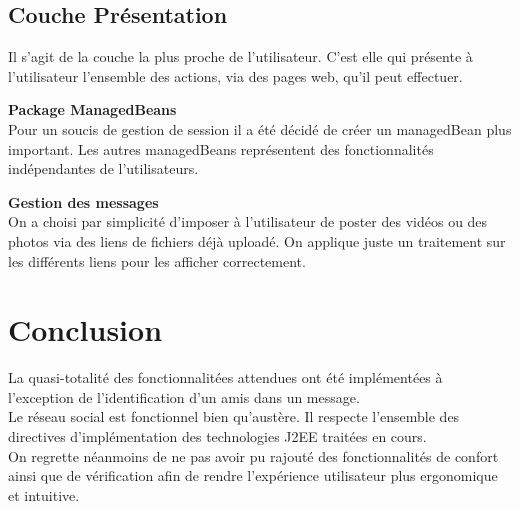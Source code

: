 \documentclass[12pt,a4paper,titlepage]{article}
\begin{document}
\subsection{Couche Présentation}
Il s'agit de la couche la plus proche de l'utilisateur. C'est elle qui présente à l'utilisateur 
l'ensemble des actions, via des pages web, qu'il peut effectuer.
\newline

\textbf{Package ManagedBeans}\\
Pour un soucis de gestion de session il a été décidé de créer un managedBean plus important.
Les autres managedBeans représentent des fonctionnalités indépendantes de l'utilisateurs.
\newline

\textbf{Gestion des messages}\\
On a choisi par simplicité d'imposer à l'utilisateur de poster des vidéos ou des photos 
via des liens de fichiers déjà uploadé. On applique juste un traitement sur les différents 
liens pour les afficher correctement.






\clearpage{\pagestyle{empty}}



\section{Conclusion}
La quasi-totalité des fonctionnalitées attendues ont été implémentées à l'exception 
de l'identification d'un amis dans un message.\\
Le réseau social est fonctionnel bien qu'austère. Il respecte l'ensemble des directives 
d'implémentation des technologies J2EE traitées en cours.\\
On regrette néanmoins de ne pas avoir pu rajouté des fonctionnalités de confort ainsi 
que de vérification afin de rendre l'expérience utilisateur plus ergonomique et intuitive.\\







\clearpage{\pagestyle{empty}}
\end{document}
